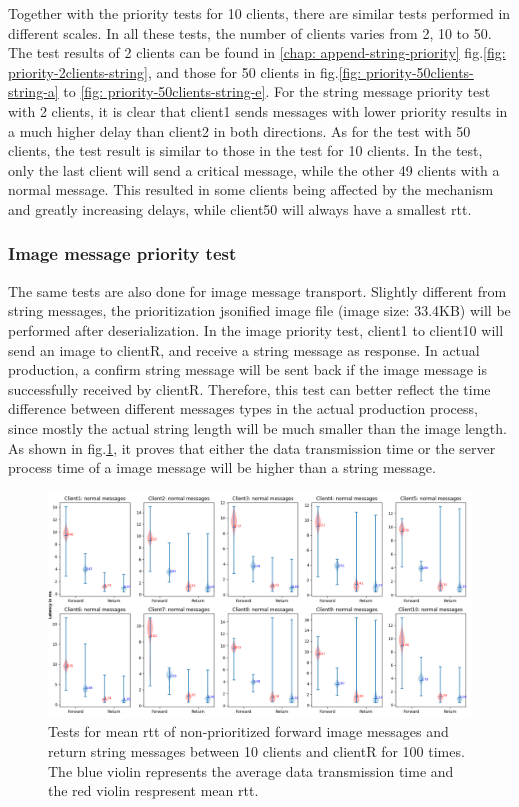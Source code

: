 Together with the priority tests for 10 clients, there are similar tests performed in different scales. 
In all these tests, the number of clients varies from 2, 10 to 50. The test results 
of 2 clients can be found in \ref{chap: append-string-priority} fig.\ref{fig: priority-2clients-string}, 
and those for 50 clients in fig.\ref{fig: priority-50clients-string-a} to 
\ref{fig: priority-50clients-string-e}. For the string message priority test with 2 clients, 
it is clear that client1 sends messages with lower priority results in 
a much higher delay than client2 in both directions. As for the test with 50 clients, 
the test result is similar to those in the test for 10 clients. In the test, only the 
last client will send a critical message, while the other 49 clients with a normal message. 
This resulted in some clients being affected by the mechanism and greatly increasing delays, 
while client50 will always have a smallest \gls{rtt}.

\subsubsection{Image message priority test}
The same tests are also done for image message transport. Slightly different 
from string messages, the prioritization jsonified image file (image size: 33.4KB) 
will be performed 
after deserialization. In the image priority test, client1 to client10 will send an 
image to clientR, and receive a string message as response. In actual production,
a confirm string message will be sent back if the image message is successfully received 
by clientR. Therefore, this test can better reflect the time difference between 
different messages types in the actual production process, since mostly the actual 
string length will be much smaller than the image length. As shown in fig.\ref{fig: priority-10clients-c}, 
it proves that either the data transmission time or the server process time of a image message 
will be higher than a string message.


\begin{figure}
    \centering
    \includegraphics[width=\textheight]{figures/tests/priority_tests/violin_10clients_image_non_priority.png}\hfill 
    \caption{Tests for mean \gls{rtt} of non-prioritized forward image messages and return string messages between 10 clients 
    and clientR for 100 times. The blue violin represents the average data transmission time and the red violin 
    respresent mean \gls{rtt}.} \label{fig: priority-10clients-c}
\end{figure}


